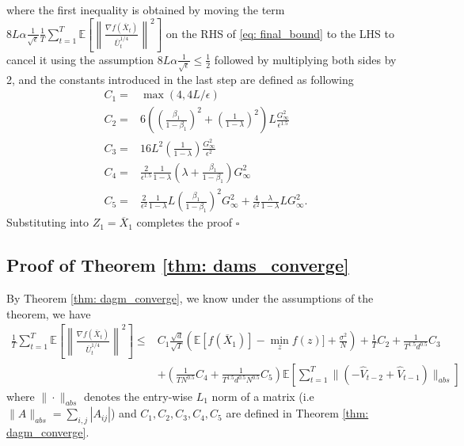 \documentclass{article} %
\begin{document}
where the first inequality is obtained by moving the term ${8L}\alpha\frac{1}{\sqrt{\epsilon}} \frac{1}{T} \sum_{t=1}^T \mathbb E \left[  \left\| \frac{\nabla f(\overline X_{t})}{{\overline U_t^{1/4}}  } \right\|^2 \right] $ on the RHS of \eqref{eq: final_bound} to the LHS to cancel it using the assumption ${8L}\alpha\frac{1}{\sqrt{\epsilon}} \leq \frac{1}{2} $ followed by multiplying both sides by 2, and the constants introduced in the last step are defined as following
\begin{align}
C_1 = & \max (4, 4{L/\epsilon}) \nonumber \\
C_2 = & 6 \left(\left( \frac{\beta_1}{1-\beta_1}\right)^2 + \left (\frac{1}{1-\lambda} \right)^2 \right)L  \frac{G_{\infty}^2 }{\epsilon^{1.5}}   \nonumber \\
C_3 = & 16L^2 \left ( \frac{1}{1-\lambda}\right) \frac{G_{\infty}^2}{\epsilon^2} \nonumber \\
C_4 = &  \frac{2}{ \epsilon^{1.5}}   \frac{1}{1-\lambda}  \left(     \lambda + \frac{\beta_1}{1-\beta_1}    \right){G_{\infty}^2} \nonumber \\
C_5 = &  \frac{2}{ \epsilon^{2}}   \frac{1}{1-\lambda}   L   \left ( \frac{\beta_1}{1-\beta_1} \right)^2 {G_{\infty}^2}  + \frac{4}{ \epsilon^{2}}   \frac{\lambda}{1-\lambda}   L    {G_{\infty}^2}  .
\end{align}
Substituting into $Z_1 = \overline X_1$ completes the proof \hfill $\square$

\subsection{Proof of Theorem \ref{thm: dams_converge}} \label{app: proof_ams}

By Theorem \ref{thm: dagm_converge}, we know under the assumptions of the theorem, we have
\begin{align}\label{eq: rep_thm1}
\frac{1}{T}\sum_{t=1}^T  \mathbb E \left [\left\|\frac{\nabla f( \overline X_{t})}{\overline U_{t}^{1/4}}\right\|^2  \right]
\leq  & C_1 \frac{\sqrt{d}}{\sqrt{T}} \left(\mathbb E  [f( \overline X_{1})]  - \min_{z} f(z)]  + \frac{\sigma^2}{N}\right)  +  \frac{ 1}{T} C_2    + \frac{1}{T^{1.5}d^{0.5}} C_3 \nonumber \\ 
&+ \left(  \frac{1}{T N^{0.5} } C_4 + \frac{1}{T^{1.5}d^{0.5} N^{0.5}} C_5  \right) \mathbb E \left[ \sum_{t=1}^{T}   \|    (- \hat V_{t-2} + \hat V_{t-1} ) \|_{abs} \right]  
\end{align}
where $\| \cdot\|_{abs}$  denotes the entry-wise $L_1$ norm of a matrix (i.e $\| A\|_{abs} = \sum_{i,j}{|A_{ij}|}$) and $C_1, C_2 ,C_3, C_4, C_5$ are defined in Theorem \ref{thm: dagm_converge}. 
\end{document}
